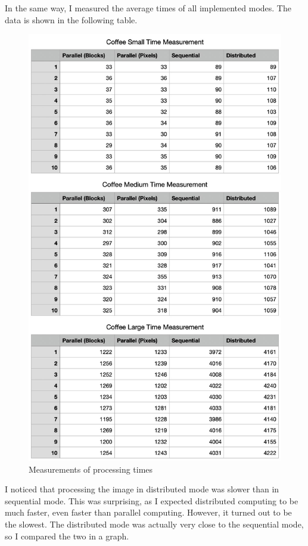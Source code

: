 \documentclass{article}
\begin{document}
\begin{multicols}{2}
    In the same way, I measured the average times of all implemented modes. The data is shown in the following table.

    \begin{figure}[H]
        \centering
        \includegraphics[width=\linewidth]{img/measurements.jpg}
        \caption{Measurements of processing times}
        \label{fig:modes}
    \end{figure}

    I noticed that processing the image in distributed mode was slower than in sequential mode. This was surprising, as I expected distributed computing to be much faster, even faster than parallel computing. However, it turned out to be the slowest. The distributed mode was actually very close to the sequential mode, so I compared the two in a graph.


\end{multicols}
\end{document}
